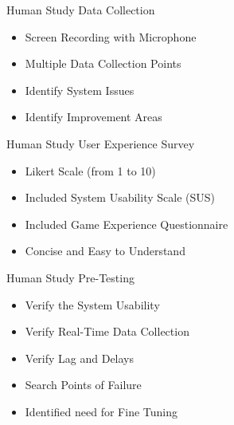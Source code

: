 \begin{frame}{Human Study \textemdash{} Data Collection}
    \begin{itemize}
        \item Screen Recording with Microphone
        \item Multiple Data Collection Points
        \item Identify System Issues
        \item Identify Improvement Areas
    \end{itemize}
\end{frame}
\begin{frame}{Human Study \textemdash{} User Experience Survey}
    \begin{itemize}
        \item Likert Scale (from 1 to 10)
        \item Included System Usability Scale (SUS)
        \item Included Game Experience Questionnaire
        \item Concise and Easy to Understand
    \end{itemize}
\end{frame}
\begin{frame}{Human Study \textemdash{} Pre-Testing}
    \begin{itemize}
        \item Verify the System Usability
        \item Verify Real-Time Data Collection
        \item Verify Lag and Delays
        \item Search Points of Failure
        \item Identified need for Fine Tuning
    \end{itemize}
\end{frame}
